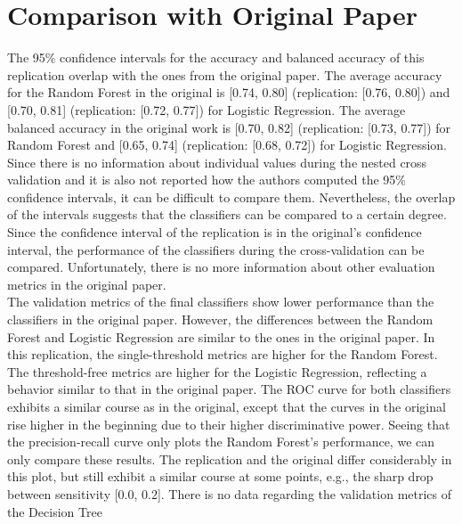 \section{Comparison with Original Paper}
The 95\% confidence intervals for the accuracy and balanced accuracy of this 
replication overlap with the ones from the original paper. The average accuracy 
for the Random Forest in the original is [0.74, 0.80] (replication: [0.76, 
0.80]) 
and [0.70, 0.81] (replication: [0.72, 0.77]) for Logistic Regression. The 
average balanced accuracy in the original work is [0.70, 0.82] (replication: 
[0.73, 0.77]) for Random Forest and [0.65, 0.74] (replication: [0.68, 0.72]) 
for Logistic Regression. Since there is no information about individual values 
during the nested cross validation and it is also not reported how the authors 
computed the 95\% confidence intervals, it can be difficult to compare them. 
Nevertheless, the overlap of the intervals suggests that the classifiers can be 
compared to a certain degree. Since the confidence interval of the replication 
is in the original's confidence interval, the performance of the 
classifiers during the cross-validation can be compared. Unfortunately, there 
is no more information about other evaluation metrics in the original paper.
\\
The validation metrics of the final classifiers show lower performance 
than the classifiers in the original paper. However, the differences between 
the Random Forest and Logistic Regression are similar to the ones in the 
original paper. In this replication, the single-threshold metrics are higher 
for the Random Forest. The threshold-free metrics are higher for the Logistic 
Regression, reflecting a behavior similar to that in the original paper. The 
ROC curve for both classifiers exhibits a similar course as in the original, 
except that the curves in the original rise higher in the beginning due to 
their higher discriminative power. Seeing that the precision-recall curve only 
plots the Random Forest's performance, we can only compare these results. 
The replication and the original differ considerably in this plot, but still 
exhibit a similar course at some points, e.g., the sharp drop between 
sensitivity [0.0, 0.2]. There is no data regarding the validation metrics of 
the Decision Tree
